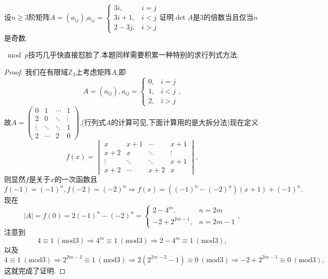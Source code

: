 \documentclass[../../main.tex]{subfiles}%
\begin{document}
\begin{example}
设\( n \geqslant 3 \)阶矩阵\( A = (a_{ij}) \),\( a_{ij} = \begin{cases}
3i, & i = j \\
3i + 1, & i < j \\
2 - 3j, & i > j
\end{cases} \)证明\( \det A \)是3的倍数当且仅当\( n \)是奇数.
\end{example}
\begin{note}
\(\bmod p\)技巧几乎快直接怼脸了.本题同样需要积累一种特别的求行列式方法.
\end{note}
\begin{proof}

我们在有限域\( \mathbb{Z}_3 \)上考虑矩阵\( A \),即
\[
A = (a_{ij}),a_{ij} = \begin{cases}
0, & i = j \\
1, & i < j \\
2, & i > j
\end{cases},
\]
故\( A = \begin{pmatrix}
0 & 1 & \cdots & 1 \\
2 & 0 & \ddots & \vdots \\
\vdots & \ddots & \ddots & 1 \\
2 & \cdots & 2 & 0
\end{pmatrix} \).(行列式$A$的计算可见,下面计算用的是大拆分法)现在定义
\[
f(x) = \begin{vmatrix}
x & x + 1 & \cdots & x + 1 \\
x + 2 & x & \ddots & \vdots \\
\vdots & \ddots & \ddots & x + 1 \\
x + 2 & \cdots & x + 2 & x
\end{vmatrix},
\]
则显然\( f \)是关于\( x \)的一次函数且
\[
f(-1) = (-1)^n,f(-2) = (-2)^n \Rightarrow f(x) = ((-1)^n - (-2)^n)(x + 1) + (-1)^n.
\]
现在
\[
|A| = f(0) = 2(-1)^n - (-2)^n = \begin{cases}
2 - 4^m, & n = 2m \\
-2 + 2^{2m - 1}, & n = 2m - 1
\end{cases},
\]
注意到
\[
4 \equiv 1\ (\text{mod}3) \Rightarrow 4^m \equiv 1\ (\text{mod}3) \Rightarrow 2 - 4^m \equiv 1\ (\text{mod}3),
\]
以及
\[
4 \equiv 1\ (\text{mod}3) \Rightarrow 2^{2m - 2} \equiv 1\ (\text{mod}3) \Rightarrow 2(2^{2m - 2} - 1) \equiv 0\ (\text{mod}3) \Rightarrow -2 + 2^{2m - 1} \equiv 0\ (\text{mod}3),
\]
这就完成了证明.

\end{proof}
\end{document}
